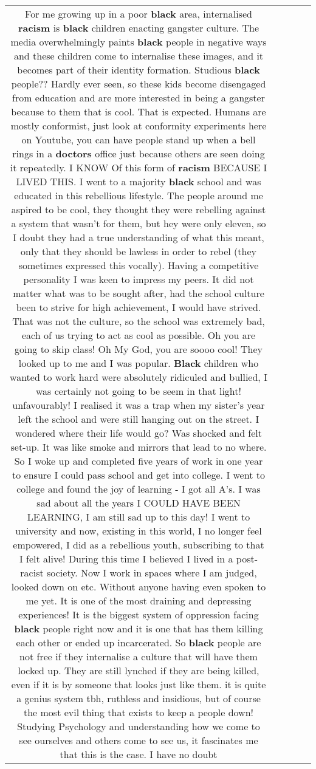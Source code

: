 \documentclass[11pt]{article}
\newlength\mylength
\begin{document}
\begin{center}
\begin{longtable}{|C{.65\mylength}|C{.30\mylength}|C{.12\mylength}|C{.12\mylength}|C{.12\mylength}|}
  \small For me growing up in a poor \textbf{black} area, internalised \textbf{racism} is \textbf{black} children enacting gangster culture. The media overwhelmingly paints \textbf{black} people in negative ways and these children come to internalise these images, and it becomes part of their identity formation. Studious \textbf{black} people?? Hardly ever seen, so these kids become disengaged from education and are more interested in being a gangster because to them that is cool. That is expected. Humans are mostly conformist, just look at conformity experiments here on Youtube, you can have people stand up when a bell rings in a \textbf{doctors} office just because others are seen doing it repeatedly. I KNOW Of this form of \textbf{racism}  BECAUSE I LIVED THIS. I went to a majority \textbf{black} school and was educated in this rebellious lifestyle. The people around me aspired to be cool, they thought they were rebelling against a system that wasn't for them, but hey were only eleven, so I doubt they had a true understanding of what this meant, only that they should be lawless in order to rebel (they sometimes expressed this vocally). Having a competitive personality I was keen to impress my peers. It did not matter what was to be sought after, had the school culture been to strive for high achievement, I would have strived. That was not the culture, so the school was extremely bad, each of us trying to act as cool as possible. Oh you are going to skip class! Oh My God, you are soooo cool! They looked up to me and I was popular. \textbf{Black} children who wanted to work hard were absolutely ridiculed and bullied, I was certainly not going to be seem in that light! unfavourably! I realised it was a trap when my sister's year left the school and were still hanging out on the street. I wondered where their life would go? Was shocked and felt set-up. It was like smoke and mirrors that lead to no where. So I woke up and completed five years of work in one year to ensure I could pass school and get into college. I went to college and found the joy of learning - I got all A's. I was sad about all the years I COULD HAVE BEEN LEARNING, I am still sad up to this day! I went to university and now, existing in this world, I no longer feel empowered, I did as a rebellious youth, subscribing to that I felt alive! During this time I believed I lived in a post-racist society. Now I work in spaces where I am judged, looked down on etc. Without anyone having even spoken to me yet. It is one of the most draining and depressing experiences! It is the biggest system of oppression facing \textbf{black} people right now and it is one that has them killing each other or ended up incarcerated. So \textbf{black} people are not free if they internalise a culture that will have them locked up. They are still lynched if they are being killed, even if it is by someone that looks just like them. it is quite a genius system tbh, ruthless and insidious, but of course the most evil thing that exists to keep a people down!  Studying Psychology and understanding how we come to see ourselves and others come to see us, it fascinates me that this is the case. I have no doubt 
\end{longtable}
\end{center}
\end{document}
